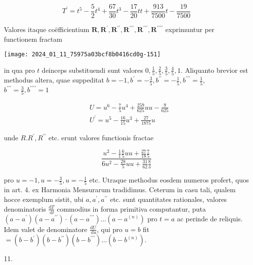 \documentclass[10pt]{article}
\begin{document}
\[
T^{\prime}=t^{5}-\frac{5}{2} t^{4}+\frac{67}{30} t^{3}-\frac{17}{20} t t+\frac{913}{7500} t-\frac{19}{7500}
\]

Valores itaque coëfficientium \(\boldsymbol{R}, \boldsymbol{R}^{\prime}, \boldsymbol{R}^{\prime \prime}, \boldsymbol{R}^{\prime \prime \prime}, \boldsymbol{R}^{\prime \prime \prime}, \boldsymbol{R}^{\prime \prime \prime \prime}\) exprimuntur per functionem fractam

\begin{center}
\texttt{[image: 2024\_01\_11\_75975a03bcf8b0416cd0g-151]}
\end{center}

in qua pro \(t\) deinceps substituendi sunt valores \(0, \frac{1}{5}, \frac{2}{5}, \frac{3}{5}, \frac{4}{5}, 1\). Aliquanto brevior est methodus altera, quae suppeditat \(b=-1, b^{\prime}=-\frac{3}{5}, b^{\prime \prime}=-\frac{1}{5}, b^{\prime \prime \prime}=\frac{1}{5}\), \(b^{\prime \prime \prime}=\frac{3}{5}, b^{\prime \prime \prime \prime}=1\)

\[
\begin{aligned}
& U=u^{6}-\frac{7}{5} u^{4}+\frac{259}{625} u u-\frac{9}{625} \\
& U^{\prime}=u^{5}-\frac{16}{15} u^{3}+\frac{27}{1875} u
\end{aligned}
\]

unde \(R . R^{\prime}, R^{\prime \prime}\) etc. erunt valores functionis fractae

\[
\frac{u^{2}-\frac{1}{1} \frac{6}{5} u u+\frac{27}{18} \frac{7}{5}}{6 u^{2}-\frac{28}{5} u u+\frac{31}{62} \frac{8}{3}}
\]

pro \(u=-1, u=-\frac{3}{5}, u=-\frac{1}{5}\) etc. Utraque methodus eosdem numeros profert, quos in art. 4. ex Harmonia Mensurarum tradidimus. Ceterum in casu tali, qualem hocce exemplum sistit, ubi \(a, a^{\prime}, a^{\prime \prime}\) etc. sunt quantitates rationales, valores denominatoris \(\frac{\mathrm{d} T}{\mathrm{~d} t}\) commodius in forma primitiva computantur, puta \(\left(a-a^{\prime}\right)\left(a-a^{\prime \prime}\right) \cdot\left(a-a^{\prime \prime \prime}\right) \ldots\left(a-a^{(n)}\right)\) pro \(t=a\) ac perinde de reliquis. Idem valet de denominatore \(\frac{\mathrm{d} U}{\mathrm{~d} u}\), qui pro \(u=b\) fit \(=\left(b-b^{\prime}\right)\left(b-b^{\prime \prime}\right)\left(b-b^{\prime \prime \prime}\right) \ldots\left(b-b^{(n)}\right)\).

11.
\end{document}
